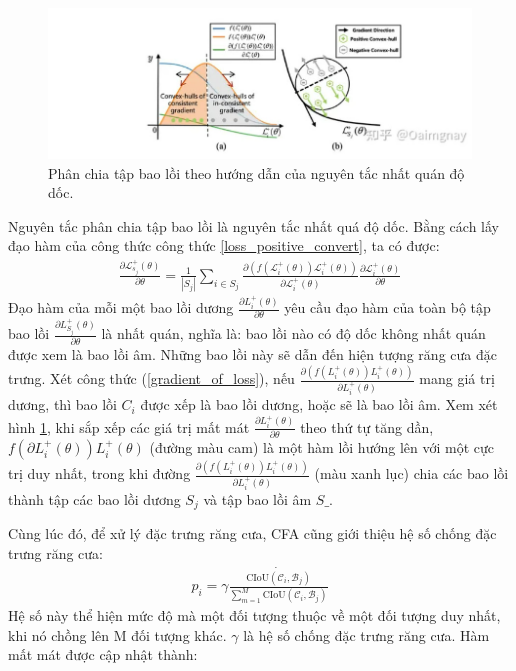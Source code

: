 \documentclass[12pt,a4paper,openany,oneside]{report}
\begin{document}
\begin{figure}[ht!]
	\begin{center}
		\includegraphics[width=445px]{./gaussian_gradient.jpg}
		\caption{Phân chia tập bao lồi theo hướng dẫn của nguyên tắc nhất quán độ dốc.}
		\label{gradient_consistentcy_illustration}
	\end{center}
\end{figure} 
Nguyên tắc phân chia tập bao lồi là nguyên tắc nhất quá độ dốc. Bằng cách lấy đạo hàm của công thức công thức \ref{loss_positive_convert}, ta có được:
\begin{align} \label{gradient_of_loss}
	 \frac{\partial \mathcal{L}_{s_j}^{+}(\theta)}{\partial \theta}=\frac{1}{\left|S_j\right|} \sum_{i \in S_j} \frac{\partial\left(f\left(\mathcal{L}_i^{+}(\theta)\right) \mathcal{L}_i^{+}(\theta)\right)}{\partial \mathcal{L}_i^{+}(\theta)} \frac{\partial \mathcal{L}_i^{+}(\theta)}{\partial \theta}
\end{align}
 Đạo hàm của mỗi một bao lồi dương $\frac{\partial L_i^{+}(\theta)}{\partial \theta}$ yêu cầu đạo hàm của toàn bộ tập bao lồi $\frac{\partial L_{S_j}^{+}(\theta)}{\partial \theta}$ là nhất quán, nghĩa là: bao lồi nào có độ dốc không nhất quán được xem là bao lồi âm. Những bao lồi này sẽ dẫn đến hiện tượng răng cưa đặc trưng. Xét công thức (\ref{gradient_of_loss}), nếu $\frac{\partial\left(f\left(L_i^{+}(\theta)\right) L_i^{+}(\theta)\right)}{\partial L_i^{+}(\theta)}$ mang giá trị dương, thì bao lồi $C_i$ được xếp là bao lồi dương, hoặc sẽ là bao lồi âm. Xem xét hình \ref{gradient_consistentcy_illustration}, khi sắp xếp các giá trị mất mát  $\frac{\partial L_i^{+}(\theta)}{\partial \theta}$ theo thứ tự tăng dần, $f\left(\partial L_i^{+}(\theta)\right) L_i^{+}(\theta)$ (đường màu cam) là một hàm lồi hướng lên với một cực trị duy nhất, trong khi đường  $\frac{\partial\left(f\left(L_i^{+}(\theta)\right) L_i^{+}(\theta)\right)}{\partial L_i^{+}(\theta)}$ (màu xanh lục) chia các bao lồi thành tập các bao lồi dương $S_j$ và tập bao lồi âm $S\_$.

Cùng lúc đó, để xử lý đặc trưng răng cưa, CFA cũng giới thiệu hệ số chống đặc trưng răng cưa:
\begin{align}\label{FAA_fomular}
	p_i = \gamma\dot{\frac{\mathrm{CIoU}(\mathcal{C}_i, \mathcal{B}_j)}{\sum_{m=1}^{M}\mathrm{CIoU}\left(\mathcal{C}_i, \mathcal{B}_j\right)}}
\end{align}
Hệ số này thể hiện mức độ mà một đối tượng thuộc về một đối tượng duy nhất, khi nó chồng lên M đối tượng khác. $\gamma$ là hệ số chống đặc trưng răng cưa.
Hàm mất mát được cập nhật thành: 
\end{document}

